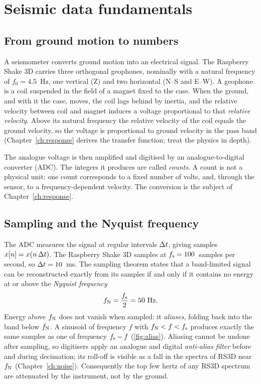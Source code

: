 \chapter{Seismic data fundamentals}\label{ch:data}

\section{From ground motion to numbers}
A seismometer converts ground motion into an electrical signal. The Raspberry Shake 3D carries three orthogonal
geophones, nominally with a natural frequency of $f_0 = 4.5$~Hz, one vertical (Z) and two horizontal (N--S and E--W).
A geophone is a coil suspended in the field of a magnet fixed to the case. When the ground, and with it the case,
moves, the coil lags behind by inertia, and the relative velocity between coil and magnet induces a voltage
proportional to that \emph{relative velocity}. Above its natural frequency the relative velocity of the coil equals
the ground velocity, so the voltage is proportional to ground velocity in the pass band
(Chapter~\ref{ch:response} derives the transfer function; \textcite{havskov2016} treat the physics in depth).

The analogue voltage is then amplified and digitised by an analogue-to-digital converter (ADC). The integers it
produces are called \emph{counts}. A count is not a physical unit: one count corresponds to a fixed number of
volts, and, through the sensor, to a frequency-dependent velocity. The conversion is the subject of
Chapter~\ref{ch:response}.

\section{Sampling and the Nyquist frequency}
The ADC measures the signal at regular intervals $\Delta t$, giving samples $x[n]=x(n\,\Delta t)$. The Raspberry Shake 3D
samples at $f_{\mathrm{s}} = 100$~samples per second, so $\Delta t = 10$~ms. The sampling theorem states that a band-limited signal
can be reconstructed exactly from its samples if and only if it contains no energy at or above the
\emph{Nyquist frequency}
\begin{equation}
  f_{\mathrm{N}} = \frac{f_{\mathrm{s}}}{2} = 50\ \text{Hz}.
\end{equation}
Energy above $f_{\mathrm{N}}$ does not vanish when sampled: it \emph{aliases}, folding back into the band below $f_{\mathrm{N}}$. A
sinusoid of frequency $f$ with $f_{\mathrm{N}} < f < f_{\mathrm{s}}$ produces exactly the same samples as one of frequency $f_{\mathrm{s}} - f$
(\cref{fig:alias}). Aliasing cannot be undone after sampling, so digitisers apply an analogue and digital
\emph{anti-alias filter} before and during decimation; its roll-off is visible as a fall in the spectra of RS3D
near $f_{\mathrm{N}}$ (Chapter~\ref{ch:noise}). Consequently the top few hertz of any RS3D spectrum are attenuated by the
instrument, not by the ground.

